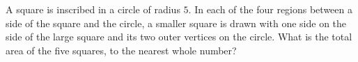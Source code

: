 A square is inscribed in a circle of radius $5$. In each of the four regions between a side of the square and the circle, a smaller square is drawn with one side on the side of the large square and its two outer vertices on the circle. What is the total area of the five squares, to the nearest whole number?
